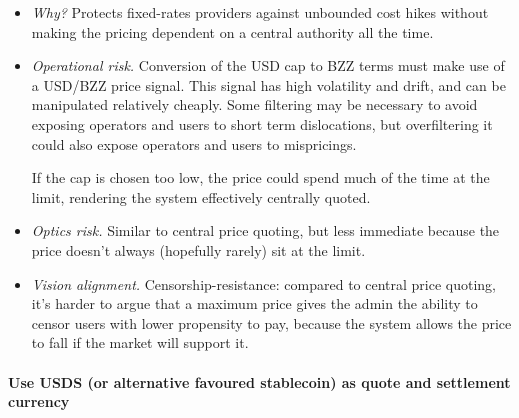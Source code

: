 \begin{itemize}
  \item \emph{Why?} Protects fixed-rates providers against unbounded cost hikes without making the pricing dependent on a central authority all the time.

  \item \emph{Operational risk.} Conversion of the USD cap to BZZ terms must make use of a USD/BZZ price signal. This signal has high volatility and drift, and can be manipulated relatively cheaply. Some filtering may be necessary to avoid exposing operators and users to short term dislocations, but overfiltering it could also expose operators and users to mispricings.

  If the cap is chosen too low, the price could spend much of the time at the limit, rendering the system effectively centrally quoted.

  \item \emph{Optics risk.} Similar to central price quoting, but less immediate because the price doesn't always (hopefully rarely) sit at the limit.

  \item \emph{Vision alignment.} Censorship-resistance: compared to central price quoting, it's harder to argue that a maximum price gives the admin the ability to censor users with lower propensity to pay, because the system allows the price to fall if the market will support it.
\end{itemize}

\paragraph{Use USDS (or alternative favoured stablecoin) as quote and settlement currency}

